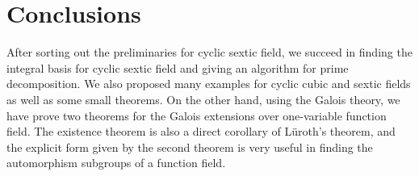 \chapter*{Conclusions}
\label{chap:conclusion}
After sorting out the preliminaries for cyclic sextic field, we succeed in finding the integral basis for cyclic sextic field and giving an algorithm for prime decomposition. We also proposed many examples for cyclic cubic and sextic fields as well as some small theorems. On the other hand, using the Galois theory, we have prove two theorems for the Galois extensions over one-variable function field. The existence theorem is also a direct corollary of L\"{u}roth's theorem, and the explicit form given by the second theorem is very useful in finding the automorphism subgroups of a function field.
